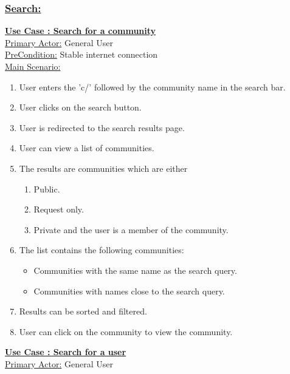 \documentclass[conference,compsoc]{IEEEtran}
\newcounter{UC}
\newcommand{\nextU}{\stepcounter{UC}\theUC}
\begin{document}
\subsubsection{\underline{Search:}}

\underline{\textbf{Use Case \nextU: Search for a community}}\\

\underline{Primary Actor:} General User\\

\underline{PreCondition:} Stable internet connection\\

\underline{Main Scenario:}\\
\begin{enumerate}
    \item User enters the 'c/' followed by the community name in the search bar.
    \item User clicks on the search button.
    \item User is redirected to the search results page.
    \item User can view a list of communities.
    \item The results are communities which are either
          \begin{enumerate}
              \item Public.
              \item Request only.
              \item Private and the user is a member of the community.
          \end{enumerate}
    \item The list contains the following communities:
          \begin{itemize}
              \item Communities with the same name as the search query.
              \item Communities with names close to the search query.
          \end{itemize}
    \item Results can be sorted and filtered.
    \item User can click on the community to view the community.
\end{enumerate}

\underline{\textbf{Use Case \nextU: Search for a user}}\\

\underline{Primary Actor:} General User\\
\end{document}
